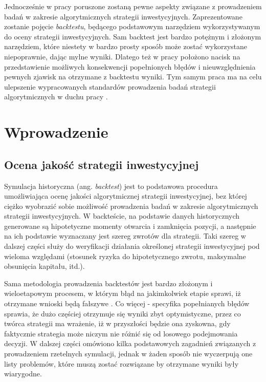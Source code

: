 \documentclass[a4paper,12pt,openany, DIV=calc, headsepline]{scrbook}
\begin{document}
Jednocześnie w pracy poruszone zostaną pewne aspekty związane z prowadzeniem badań w zakresie algorytmicznych strategii inwestycyjnych. Zaprezentowane zostanie pojęcie \emph{backtestu}, będącego podstawowym narzędziem wykorzystywanym do oceny strategii inwestycyjnych. Sam backtest jest bardzo potężnym i złożonym narzędziem, które niestety w bardzo prosty sposób może zostać wykorzystane niepoprawnie, dając mylne wyniki. Dlatego też w pracy położono nacisk na przedstawienie możliwych konsekwencji popełnionych błędów i nieuwzględnienia pewnych zjawisk na otrzymane z backtestu wyniki. Tym samym praca ma na celu ulepszenie wypracowanych standardów prowadzenia badań strategii algorytmicznych w duchu pracy \citep{de2015future}.


\chapter{Wprowadzenie}

\section{Ocena jakość strategii inwestycyjnej}

Symulacja historyczna (ang. \emph{backtest}) jest to  podstawowa procedura umożliwiająca ocenę jakości algorytmicznej strategii inwestycyjnej, bez której ciężko wyobrazić sobie możliwość prowadzenia badań w zakresie algorytmicznych strategii inwestycyjnych. W backteście, na podstawie danych historycznych generowane są hipotetyczne momenty otwarcia i zamknięcia pozycji, a następnie na ich podstawie wyznaczany jest szereg zwrotów dla strategii. Taki szereg w dalszej części służy do weryfikacji działania określonej strategii inwestycyjnej pod wieloma względami (stosunek ryzyka do hipotetycznego zwrotu, maksymalne obsunięcia kapitału, itd.). 

Sama metodologia prowadzenia backtestów jest bardzo złożonym i wieloetapowym procesem, w którym błąd na jakimkolwiek etapie sprawi, iż otrzymane wnioski będą fałszywe . Co więcej - specyfika popełnianych błędów sprawia, że dużo częściej otrzymuje się wyniki zbyt optymistyczne, przez co twórca strategii ma wrażenie, iż w przyszłości będzie ona zyskowna, gdy faktycznie strategia może niczym nie różnić się od losowego podejmowania decyzji. W dalszej części omówiono kilka podstawowych zagadnień związanych z prowadzeniem rzetelnych symulacji, jednak w żaden sposób nie wyczerpują one listy problemów, które muszą zostać rozwiązane by otrzymane wyniki były wiarygodne.
\end{document}
